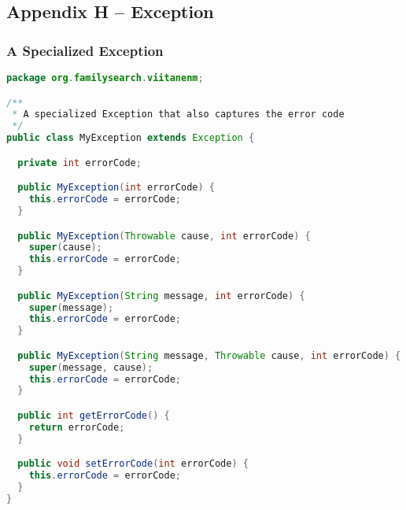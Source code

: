 \subsection*{Appendix H -- Exception} \label{App:AppendixH}
\subsubsection{A Specialized Exception}
\begin{lstlisting}[language=Java]
package org.familysearch.viitanenm;

/**
 * A specialized Exception that also captures the error code
 */
public class MyException extends Exception {

  private int errorCode;

  public MyException(int errorCode) {
    this.errorCode = errorCode;
  }

  public MyException(Throwable cause, int errorCode) {
    super(cause);
    this.errorCode = errorCode;
  }

  public MyException(String message, int errorCode) {
    super(message);
    this.errorCode = errorCode;
  }

  public MyException(String message, Throwable cause, int errorCode) {
    super(message, cause);
    this.errorCode = errorCode;
  }

  public int getErrorCode() {
    return errorCode;
  }

  public void setErrorCode(int errorCode) {
    this.errorCode = errorCode;
  }
}
\end{lstlisting}


